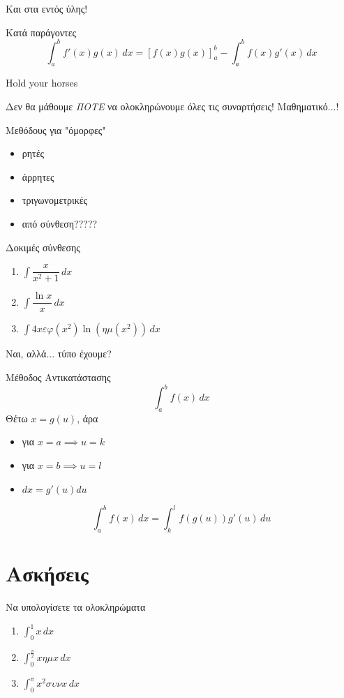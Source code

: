 \documentclass{presentation}
\begin{document}
\begin{frame}{Και στα εντός ύλης!}
  \begin{block}{Κατά παράγοντες}
    $$\int_a^b f'(x)g(x)\,dx=\left[ f(x)g(x) \right]_a^b -\int_a^b f(x)g'(x)\,dx$$
  \end{block}
\end{frame}

\begin{frame}{Hold your horses}

  Δεν θα μάθουμε \emph{ΠΟΤΕ} να ολοκληρώνουμε όλες τις συναρτήσεις! Μαθηματικό...!

  Μεθόδους για "όμορφες"

  \begin{itemize}
    \item<2-> ρητές
    \item<3-> άρρητες
    \item<4-> τριγωνομετρικές
    \item<5-> από σύνθεση?????
  \end{itemize}

\end{frame}

\begin{frame}{Δοκιμές σύνθεσης}
  \begin{enumerate}
    \item<1-> $\int \dfrac{x}{x^2+1}\,dx$
    \item<2-> $\int \dfrac{\ln x}{x}\, dx$
    \item<3-> $\int 4xεφ(x^2)\ln (ημ(x^2))\, dx$
  \end{enumerate}

\end{frame}

\begin{frame}{Ναι, αλλά... τύπο έχουμε?}
  \begin{block}{Μέθοδος Αντικατάστασης}
    $$\int_a^b f(x)\, dx$$
    Θέτω $x=g(u)$, άρα
    \begin{itemize}
      \item για $x=a\implies u=k$
      \item για $x=b\implies u=l$
      \item $dx=g'(u)du$
    \end{itemize}
    $$\int_a^b f(x)\, dx=\int_{k}^{l} f(g(u))g'(u)\,du$$
  \end{block}

\end{frame}

\section{Ασκήσεις}
\begin{askisi}
  Να υπολογίσετε τα ολοκληρώματα
  \begin{enumerate}
    \item<1-> $\int_{0}^{1}x\,dx$
    \item<2-> $\int_{0}^{\frac{π}{2}}xημx\,dx$
    \item<3-> $\int_{0}^{π}x^2συνx\,dx$
  \end{enumerate}

\end{askisi}
\end{document}
